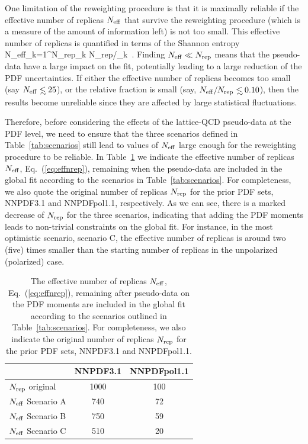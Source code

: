 One limitation of the reweighting procedure is that it is maximally 
reliable if the effective number of replicas $N_{\rm eff}$ that survive the 
reweighting procedure (which is a measure of the amount
of information left) is not too small.
%
This effective number of replicas is quantified in terms of the Shannon 
entropy~\cite{Ball:2011gg,Ball:2010gb}
\be
\label{eq:effnrep}
N_{\rm eff}\equiv \exp\lc {}\sum_{k=1}^{N_{\rm rep}}\omega_k
\log \lp N_{\rm rep}/\omega_k\rp\rc \, .
\ee
%
Finding $N_{\rm eff}\ll N_{\rm rep}$ means that the pseudo-data
have a large impact on the fit, potentially leading to a large
reduction of the PDF uncertainties.
%
If either the effective number of replicas becomes too small 
(say $N_{\rm eff}\lsim 25$), or the relative fraction is small 
(say, $N_{\rm eff}/N_{\rm rep}\lsim 0.10$), then the results become unreliable 
since they are affected by large statistical fluctuations.

Therefore, before considering the effects
of the lattice-QCD pseudo-data at the PDF
level, we need to ensure that the
three scenarios defined
in Table~\ref{tab:scenarios} still lead
to values of $N_{\rm eff}$ large enough for
the reweighting procedure to be reliable.
%
In Table~\ref{tab:neff} we indicate the effective number of replicas
$N_{\rm eff}$, Eq.~(\ref{eq:effnrep}), remaining when the pseudo-data
are included in the global
fit according to the scenarios in Table~\ref{tab:scenarios}.
%
For completeness, we also quote the original number
of replicas $N_{\rm rep}$ for the prior
PDF sets, NNPDF3.1 and NNPDFpol1.1, respectively.
%
As we can see, there is a marked decrease of $N_{\rm rep}$
for the three scenarios, indicating that adding the
PDF moments leads to non-trivial constraints on the global fit.
%
For instance, in the most optimistic scenario, scenario C, the effective 
number of replicas is around two (five) times smaller than the starting 
number of replicas in the unpolarized (polarized) case.

\begin{table}[!t]
\centering
\footnotesize
\renewcommand{\arraystretch}{1.3} 
\begin{tabular}{lcc}
\toprule
&  NNPDF3.1  &  NNPDFpol1.1 \\
\midrule
$N_{\rm rep}$ original   &   1000 &  100   \\
$N_{\rm eff}$ Scenario A    &   740  &  72   \\
$N_{\rm eff}$ Scenario B    &   750   &   59  \\
$N_{\rm eff}$ Scenario C   &   510  &   20  \\
\bottomrule
\end{tabular}
\caption{\small The effective number of replicas
$N_{\rm eff}$, Eq.~(\ref{eq:effnrep}), remaining after pseudo-data
on the PDF moments are included in the global
fit according to the scenarios outlined
in Table~\ref{tab:scenarios}.
%
For completeness, we also indicate the original number
of replicas $N_{\rm rep}$ for the prior
PDF sets, NNPDF3.1 and NNPDFpol1.1.
\label{tab:neff}}
\end{table}

